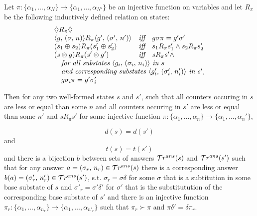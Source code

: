 \begin{lemma}
\label{lem:gen_measures_changing_env}
Let $\pi \colon \{ \alpha_1, \dots, \alpha_N \} \to \{ \alpha_1, \dots, \alpha_{N'} \}$ be an injective function on variables and let $R_{\pi}$ be the following inductively defined relation on states:
\[ \begin{array}{lcl}
\Diamond R_{\pi} \Diamond & & \\
\taskst{g}{\mkenv{\sigma}{n}} R_{\pi} \taskst{g'}{\mkenv{\sigma'}{n'}} & \textit{iff} & g \sigma \pi = g' \sigma' \\
(s_1 \oplus s_2) R_{\pi} (s'_1 \oplus s'_2) & \textit{iff} & s_1 R_{\pi} s'_1 \land s_2 R_{\pi} s'_2  \\
(s \otimes g) R_{\pi} (s' \otimes g') & \textit{iff} & s R_{\pi} s' \land \\
\multicolumn{3}{l}{\textit{\quad for all substates $\taskst{g_i}{\mkenv{\sigma_i}{n_i}}$ in $s$}}\\
\multicolumn{3}{l}{\textit{\quad and corresponding substates $\taskst{g'_i}{\mkenv{\sigma'_i}{n'_i}}$ in $s'$,}} \\
\multicolumn{3}{l}{\quad g \sigma_i \pi = g' \sigma'_i} \\
\end{array} \]

Then for any two well-formed states $s$ and $s'$, such that all counters occuring in $s$ are less or equal than some $n$ and all counters occuring in $s'$ are less or equal than some $n'$ and $s R_{\pi} s'$ for some injective function $\pi \colon \{ \alpha_1, \dots, \alpha_n \} \to \{ \alpha_1, \dots, \alpha_n' \}$,

\[ d(s) = d(s') \]
and \[ t(s) = t(s') \]
and there is a bijection $b$ between sets of answers $\mathcal{T}r^{ans}(s)$ and $\mathcal{T}r^{ans}(s')$ such that for any answer $a = (\sigma_r ,\, n_r) \in \mathcal{T}r^{ans}(s)$ there is a corresponding answer $b(a) = (\sigma'_r ,\, n'_r) \in \mathcal{T}r^{ans}(s')$, s.t. $\sigma_r = \sigma \delta$ for some $\sigma$ that is a subtitution in some base substate of $s$ and $\sigma'_r = \sigma' \delta'$ for $\sigma'$ that is the substitutution of the corresponding base substate of $s'$ and there is an injective function $\pi_r \colon \{ \alpha_1, \dots, \alpha_{n_r} \} \to \{ \alpha_1, \dots, \alpha_{n'_r} \}$ such that $\pi_r \succ \pi$ and $\pi \delta' = \delta \pi_r$.
\end{lemma}
